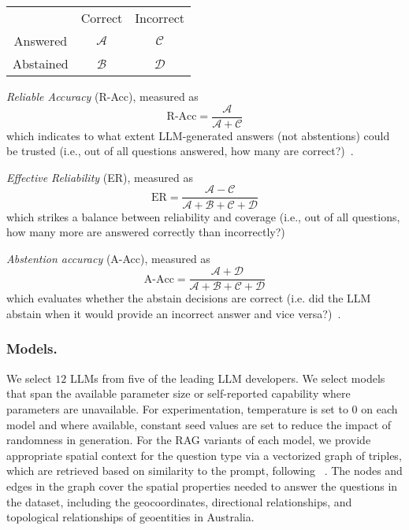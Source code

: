 \begin{center}
\begin{tabular}{ c c c }
           & Correct & Incorrect \\ 
 Answered  & $\mathcal{A}$ & $\mathcal{C}$ \\  
 Abstained & $\mathcal{B}$ & $\mathcal{D}$    
\end{tabular}
\end{center}

\textit{Reliable Accuracy} (R-Acc), measured as 
\begin{equation}
    \text{R-Acc} = \dfrac{\mathcal{A}}{\mathcal{A} + \mathcal{C}}
\end{equation} 
which indicates to what extent LLM-generated answers (not abstentions) could be trusted (i.e., out of all questions answered, how many are correct?)~\cite{Feng2024}. 

\textit{Effective Reliability} (ER), measured as
\begin{equation}
    \text{ER} = \dfrac{\mathcal{A} - \mathcal{C}}{\mathcal{A} + \mathcal{B} + \mathcal{C} + \mathcal{D}}
\end{equation} 
which strikes a balance between reliability and coverage (i.e., out of all questions, how many more are answered correctly than incorrectly?)~\cite{Feng2024}

\textit{Abstention accuracy} (A-Acc), measured as
\begin{equation}
    \text{A-Acc} = \dfrac{\mathcal{A} + \mathcal{D}}{\mathcal{A} + \mathcal{B} + \mathcal{C} + \mathcal{D}}
\end{equation} 
which evaluates whether the abstain decisions are correct (i.e. did the LLM abstain when it would provide an incorrect answer and vice versa?)~\cite{Feng2024}. 



\subsubsection{Models.}
We select $12$ LLMs from five of the leading LLM developers. 
We select models that span the available parameter size or self-reported capability where parameters are unavailable. 
For experimentation, temperature is set to $0$ on each model and where available, constant seed values are set to reduce the impact of randomness in generation.
For the RAG variants of each model, we provide appropriate spatial context for the question type via a vectorized graph of triples, which are retrieved based on similarity to the prompt, following \citeauthor{Schneider2025b}~\cite{Schneider2025b}.
The nodes and edges in the graph cover the spatial properties needed to answer the questions in the dataset, including the geocoordinates, directional relationships, and topological relationships of geoentities in Australia.


